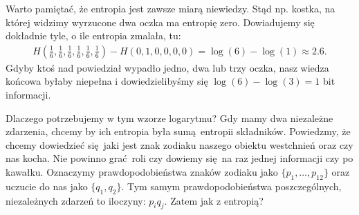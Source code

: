 \documentclass[10pt,a4paper]{article}
\begin{document}
Warto pamiętać, że entropia jest zawsze miarą niewiedzy.
Stąd np. kostka, na której widzimy wyrzucone dwa oczka ma entropię zero.
Dowiadujemy się dokładnie tyle, o ile entropia zmalała, tu:
%
\begin{align}
    H(\tfrac{1}{6}, \tfrac{1}{6}, \tfrac{1}{6}, \tfrac{1}{6}, \tfrac{1}{6}, \tfrac{1}{6})
    - H(0, 1, 0, 0, 0, 0) = \log(6) - \log(1)
    \approx 2.6.
\end{align}
%
Gdyby ktoś nad powiedział wypadło jedno, dwa lub trzy oczka, nasz wiedza końcowa byłaby niepełna i dowiedzielibyśmy się $\log(6) - \log(3) = 1 $ bit informacji.




Dlaczego potrzebujemy w tym wzorze logarytmu? 
Gdy mamy dwa niezależne zdarzenia, chcemy by ich entropia była sumą entropii składników.
Powiedzmy, że chcemy dowiedzieć się jaki jest znak zodiaku naszego obiektu westchnień oraz czy nas kocha.
Nie powinno grać roli czy dowiemy się na raz jednej informacji czy po kawałku.
Oznaczymy prawdopodobieństwa znaków zodiaku jako $\{p_1, \ldots, p_{12} \}$ oraz uczucie do nas jako $\{q_1, q_2\}$.
Tym samym prawdopodobieństwa poszczególnych, niezależnych zdarzeń to iloczyny: $p_i q_j$.
Zatem jak z entropią?
%
%
\end{document}
